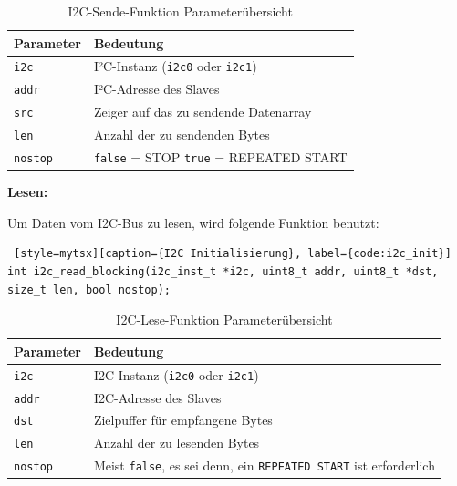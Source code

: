 \begin{inhalt}
\begin{table}[H]
\centering
\renewcommand{\arraystretch}{1.3}
\begin{tabular}{|l|p{10cm}|}
\hline
\rowcolor{cyan!20}
\textbf{Parameter} & \textbf{Bedeutung} \\
\hline
\texttt{i2c} & I²C-Instanz (\texttt{i2c0} oder \texttt{i2c1}) \\
\hline
\texttt{addr} & I²C-Adresse des Slaves \\
\hline
\texttt{src} & Zeiger auf das zu sendende Datenarray \\
\hline
\texttt{len} & Anzahl der zu sendenden Bytes \\
\hline
\texttt{nostop} & \texttt{false} = STOP \newline
\texttt{true} = REPEATED START \\
\hline
\end{tabular}
\caption{I2C-Sende-Funktion Parameterübersicht}
\label{tab:i2c_parameter}
\end{table}




\textbf{Lesen:}

Um Daten vom I2C-Bus zu lesen, wird folgende Funktion benutzt:

\begin{lstlisting} [style=mytsx][caption={I2C Initialisierung}, label={code:i2c_init}]
int i2c_read_blocking(i2c_inst_t *i2c, uint8_t addr, uint8_t *dst, size_t len, bool nostop);
\end{lstlisting}

\begin{table}[H]
\centering
\renewcommand{\arraystretch}{1.3}
\begin{tabular}{|l|p{10cm}|}
\hline
\rowcolor{cyan!20}
\textbf{Parameter} & \textbf{Bedeutung} \\
\hline
\texttt{i2c} & I2C-Instanz (\texttt{i2c0} oder \texttt{i2c1}) \\
\hline
\texttt{addr} & I2C-Adresse des Slaves \\
\hline
\texttt{dst} & Zielpuffer für empfangene Bytes \\
\hline
\texttt{len} & Anzahl der zu lesenden Bytes \\
\hline
\texttt{nostop} & Meist \texttt{false}, es sei denn, ein \texttt{REPEATED START} ist erforderlich \\
\hline
\end{tabular}
\caption{I2C-Lese-Funktion Parameterübersicht}
\label{tab:i2c_read_parameters}
\end{table}


\end{inhalt}

